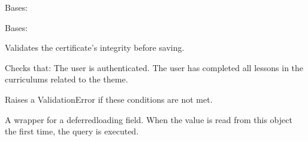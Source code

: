 \documentclass[letterpaper,10pt,english]{sphinxmanual}
\begin{document}
\begin{fulllineitems}
\begin{fulllineitems}
\end{fulllineitems}


\begin{fulllineitems}
\label{\detokenize{certificates:certificates.models.Certificate.DoesNotExist}}
\pysigstartsignatures
\pysigline
{}
\pysigstopsignatures
\sphinxAtStartPar
Bases: 

\end{fulllineitems}


\begin{fulllineitems}
\label{\detokenize{certificates:certificates.models.Certificate.MultipleObjectsReturned}}
\pysigstartsignatures
\pysigline
{}
\pysigstopsignatures
\sphinxAtStartPar
Bases: 

\end{fulllineitems}


\begin{fulllineitems}
\label{\detokenize{certificates:id0}}
\pysigstartsignatures
\pysiglinewithargsret
{}
{}
{}
\pysigstopsignatures
\sphinxAtStartPar
Validates the certificate’s integrity before saving.

\sphinxAtStartPar
Checks that:
\sphinxhyphen{} The user is authenticated.
\sphinxhyphen{} The user has completed all lessons in the curriculums related to the theme.

\sphinxAtStartPar
Raises a ValidationError if these conditions are not met.

\end{fulllineitems}


\begin{fulllineitems}
\label{\detokenize{certificates:certificates.models.Certificate.created_at}}
\pysigstartsignatures
\pysigline
{}
\pysigstopsignatures
\sphinxAtStartPar
A wrapper for a deferred\sphinxhyphen{}loading field. When the value is read from this
object the first time, the query is executed.


\end{fulllineitems}
\end{fulllineitems}
\end{document}
